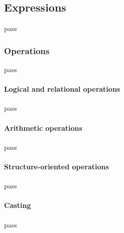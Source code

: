 \subsection{Expressions}
\label{sec:expressions}
pass

\subsubsection{Operations}
pass

\paragraph{Logical and relational operations}
pass

\paragraph{Arithmetic operations}
pass

\paragraph{Structure-oriented operations}
pass

\paragraph{Casting}
\label{sec:casting}
pass